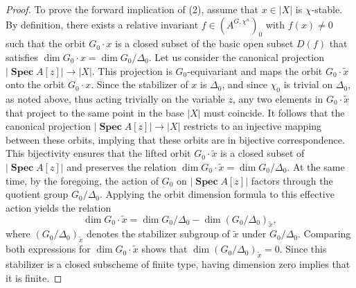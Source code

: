 \documentclass[11pt,a4paper,reqno,noamsfonts]{amsart}
\numberwithin{equation}{section}
\theoremstyle{definition}
\theoremstyle{remark}
\DeclareMathOperator{\sSpec}{\mathbf{Spec}}
\begin{document}
\begin{proof}
To prove the forward implication of (2), assume that $x \in \lvert X \rvert$ is $\chi$-stable. By definition, there exists a relative invariant $f \in (A^{G,\chi^n})_0$ with $f(x) \neq 0$ such that the orbit $G_0 \cdot x$ is a closed subset of the basic open subset $D(f)$ that satisfies $\dim G_0 \cdot x = \dim G_0/\Delta_0$. Let us consider the canonical projection $\lvert \sSpec A[z] \rvert \to \lvert X \rvert$. This projection is $G_0$-equivariant and maps the orbit $G_0 \cdot \tilde{x}$ onto the orbit $G_0 \cdot x$. Since the stabilizer of $x$ is $\Delta_0$, and since $\chi_0$ is trivial on $\Delta_0$, as noted above, thus acting trivially on the variable $z$, any two elements in $G_0 \cdot \tilde{x}$ that project to the same point in the base $\lvert X \rvert$ must coincide. It follows that the canonical projection $\lvert \sSpec A[z] \rvert \to \lvert X \rvert$ restricts to an injective mapping between these orbits, implying that these orbits are in bijective correspondence. This bijectivity ensures that the lifted orbit $G_0 \cdot \tilde{x}$ is a closed subset of $\lvert \sSpec A[z] \rvert$ and preserves the relation $\dim G_0 \cdot \tilde{x} =  \dim G_0/\Delta_0$. At the same time, by the foregoing, the action of $G_0$ on $\lvert \sSpec A[z] \rvert$ factors through the quotient group $G_0/\Delta_0$. Applying the orbit dimension formula to this effective action yields the relation
$$
\dim G_0 \cdot \tilde{x} = \dim G_0/\Delta_0 - \dim (G_0/\Delta_0)_{\tilde{x}},
$$
where $(G_0/\Delta_0)_{\tilde{x}}$ denotes the stabilizer subgroup of $\tilde{x}$ under $G_0/\Delta_0$. Comparing both expressions for $\dim G_0 \cdot \tilde{x}$ shows that $\dim (G_0/\Delta_0)_{\tilde{x}} = 0$. Since this stabilizer is a closed subscheme of finite type, having dimension zero implies that it is finite.


\end{proof}
\end{document}

